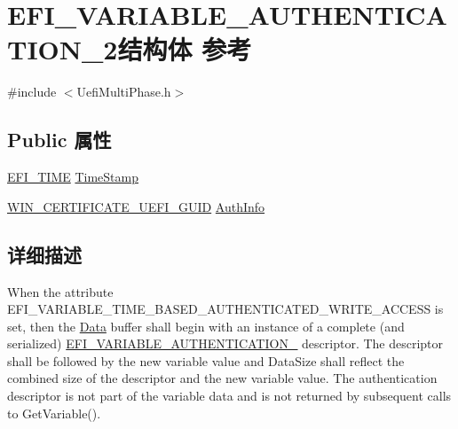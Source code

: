\hypertarget{struct_e_f_i___v_a_r_i_a_b_l_e___a_u_t_h_e_n_t_i_c_a_t_i_o_n__2}{}\section{E\+F\+I\+\_\+\+V\+A\+R\+I\+A\+B\+L\+E\+\_\+\+A\+U\+T\+H\+E\+N\+T\+I\+C\+A\+T\+I\+O\+N\+\_\+2结构体 参考}
\label{struct_e_f_i___v_a_r_i_a_b_l_e___a_u_t_h_e_n_t_i_c_a_t_i_o_n__2}


{\ttfamily \#include $<$Uefi\+Multi\+Phase.\+h$>$}

\subsection*{Public 属性}
\begin{DoxyCompactItemize}
\item 
\hyperlink{struct_e_f_i___t_i_m_e}{E\+F\+I\+\_\+\+T\+I\+ME} \hyperlink{struct_e_f_i___v_a_r_i_a_b_l_e___a_u_t_h_e_n_t_i_c_a_t_i_o_n__2_a6ea5235eefe94e28a5c9f7859c2b6724}{Time\+Stamp}
\item 
\hyperlink{struct_w_i_n___c_e_r_t_i_f_i_c_a_t_e___u_e_f_i___g_u_i_d}{W\+I\+N\+\_\+\+C\+E\+R\+T\+I\+F\+I\+C\+A\+T\+E\+\_\+\+U\+E\+F\+I\+\_\+\+G\+U\+ID} \hyperlink{struct_e_f_i___v_a_r_i_a_b_l_e___a_u_t_h_e_n_t_i_c_a_t_i_o_n__2_acbd6043762b123eab1e7e4320eb533a7}{Auth\+Info}
\end{DoxyCompactItemize}


\subsection{详细描述}
When the attribute E\+F\+I\+\_\+\+V\+A\+R\+I\+A\+B\+L\+E\+\_\+\+T\+I\+M\+E\+\_\+\+B\+A\+S\+E\+D\+\_\+\+A\+U\+T\+H\+E\+N\+T\+I\+C\+A\+T\+E\+D\+\_\+\+W\+R\+I\+T\+E\+\_\+\+A\+C\+C\+E\+SS is set, then the \hyperlink{struct_data}{Data} buffer shall begin with an instance of a complete (and serialized) \hyperlink{struct_e_f_i___v_a_r_i_a_b_l_e___a_u_t_h_e_n_t_i_c_a_t_i_o_n__2}{E\+F\+I\+\_\+\+V\+A\+R\+I\+A\+B\+L\+E\+\_\+\+A\+U\+T\+H\+E\+N\+T\+I\+C\+A\+T\+I\+O\+N\+\_} descriptor. The descriptor shall be followed by the new variable value and Data\+Size shall reflect the combined size of the descriptor and the new variable value. The authentication descriptor is not part of the variable data and is not returned by subsequent calls to Get\+Variable(). 

